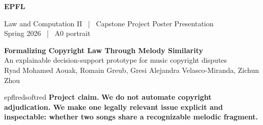 \documentclass[portrait,a0,final]{a0poster}
\newcommand{\logofont}{\fontsize{78}{82}\selectfont}
\newcommand{\titlefont}{\fontsize{56}{64}\selectfont}
\newcommand{\subtitlefont}{\fontsize{28}{34}\selectfont}
\newcommand{\bodyfont}{\fontsize{21.5}{27}\selectfont}
\newcommand{\smallfont}{\fontsize{16.5}{20.5}\selectfont}
\begin{document}
\bodyfont

\begin{minipage}[t]{0.22\textwidth}
  {\logofont\bfseries\color{epflred}EPFL}
\end{minipage}
\hfill
\begin{minipage}[t]{0.50\textwidth}
  \raggedleft
  {\smallfont Law and Computation II \, | \, Capstone Project Poster Presentation\\
  Spring 2026 \, | \, A0 portrait}
\end{minipage}

\vspace{7mm}

\begin{tcolorbox}[
  enhanced,
  colback=epflred,
  colframe=epflred,
  boxrule=0pt,
  sharp corners,
  left=11mm,
  right=11mm,
  top=11mm,
  bottom=10mm
]
{\titlefont\bfseries\color{white} Formalizing Copyright Law Through Melody Similarity}\\[4mm]
{\subtitlefont\color{white} An explainable decision-support prototype for music copyright disputes}\\[5mm]
{\smallfont\color{white} Ryad Mohamed Aouak, Romain Greub, Gresi Alejandra Velasco-Miranda, Zichun Zhou}
\end{tcolorbox}

\vspace{5mm}

\begin{callout}{epflred}{softred}
{\subtitlefont\bfseries Project claim.}
\hspace{3mm}
{\bodyfont\bfseries We do not automate copyright adjudication. We make one legally relevant issue explicit and inspectable: whether two songs share a recognizable melodic fragment.}
\end{callout}

\vspace{7mm}
\end{document}
